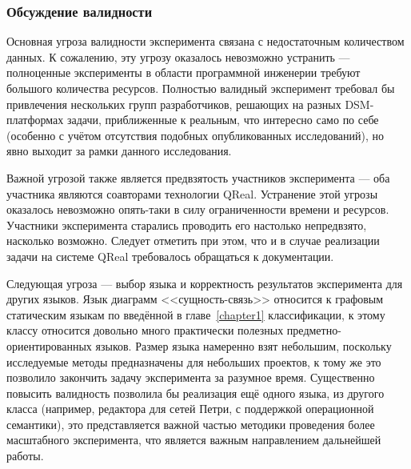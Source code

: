 \subsubsection{Обсуждение валидности}
Основная угроза валидности эксперимента связана с недостаточным количеством данных.
К сожалению, эту угрозу оказалось невозможно устранить --- полноценные эксперименты 
в области программной инженерии требуют большого количества ресурсов. Полностью валидный
эксперимент требовал бы привлечения нескольких групп разработчиков, решающих на разных
\ac{DSM}-платформах задачи, приближенные к реальным, что интересно само по себе (особенно с 
учётом отсутствия подобных опубликованных исследований), но явно выходит за рамки данного
исследования.

Важной угрозой также является предвзятость участников эксперимента --- оба участника
являются соавторами технологии QReal. Устранение этой угрозы оказалось невозможно
опять-таки в силу ограниченности времени и ресурсов. Участники эксперимента старались
проводить его настолько непредвзято, насколько возможно. Следует отметить при этом, что
и в случае реализации задачи на системе QReal требовалось обращаться к документации.

Следующая угроза --- выбор языка и корректность результатов эксперимента для других языков.
Язык диаграмм <<сущность-связь>> относится к графовым статическим языкам по введённой 
в главе~\ref{chapter1} классификации, к этому классу относится довольно много практически полезных 
предметно-ориентированных языков. Размер языка намеренно взят небольшим, поскольку
исследуемые методы предназначены для небольших проектов, к тому же это позволило закончить
задачу эксперимента за разумное время. Существенно повысить валидность позволила бы реализация
ещё одного языка, из другого класса (например, редактора для сетей Петри, с поддержкой
операционной семантики), это представляется важной частью методики проведения более масштабного
эксперимента, что является важным направлением дальнейшей работы.

